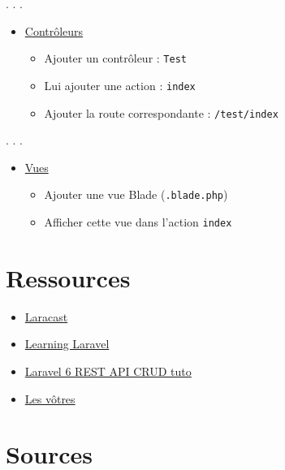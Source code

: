 . . .

\begin{itemize}
\tightlist
\item
  \href{https://laravel.com/docs/master/controllers}{Contrôleurs}

  \begin{itemize}
  \tightlist
  \item
    Ajouter un contrôleur : \textenglish{\texttt{Test}}
  \item
    Lui ajouter une action : \textenglish{\texttt{index}}
  \item
    Ajouter la route correspondante : \textenglish{\texttt{/test/index}}
  \end{itemize}
\end{itemize}

. . .

\begin{itemize}
\tightlist
\item
  \href{https://laravel.com/docs/master/views}{Vues}

  \begin{itemize}
  \tightlist
  \item
    Ajouter une vue Blade (\textenglish{\texttt{.blade.php}})
  \item
    Afficher cette vue dans l'action \textenglish{\texttt{index}}
  \end{itemize}
\end{itemize}

\hypertarget{ressources}{%
\section{Ressources}\label{ressources}}

\begin{itemize}
\tightlist
\item
  \href{https://laracasts.com/series/laravel-6-from-scratch}{Laracast}
\item
  \href{http://learninglaravel.net/tags/tutorials}{Learning Laravel}
\item
  \href{https://www.techiediaries.com/laravel-tutorial-rest-crud-api-models-relationships/}{Laravel
  6 REST API CRUD tuto}
\item
  \href{https://github.com/HE-Arc/slides-devweb/wiki/Ressources}{Les
  vôtres}
\end{itemize}

\hypertarget{sources}{%
\section{Sources}\label{sources}}
